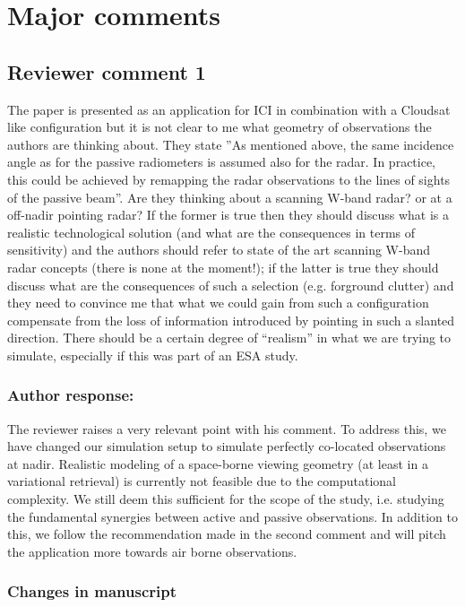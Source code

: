 \section{Major comments}

\subsection*{Reviewer comment 1}

The paper is presented as an application for ICI in combination with a
Cloudsat like configuration but it is not clear to me what geometry of
observations the authors are thinking about. They state ''As mentioned above, the
same incidence angle as for the passive radiometers is assumed also for the
radar. In practice, this could be achieved by remapping the radar observations to
the lines of sights of the passive beam''. Are they thinking about a scanning
W-band radar? or at a off-nadir pointing radar? If the former is true then they
should discuss what is a realistic technological solution (and what are the
consequences in terms of sensitivity) and the authors should refer to state of
the art scanning W-band radar concepts (there is none at the moment!); if the
latter is true they should discuss what are the consequences of such a selection
(e.g. forground clutter) and they need to convince me that what we could gain
from such a configuration compensate from the loss of information introduced by
pointing in such a slanted direction. There should be a certain degree of
“realism” in what we are trying to simulate, especially if this was part of an
ESA study.

\subsubsection*{Author response:}

The reviewer raises a very relevant point with his comment. To address this, we
have changed our simulation setup to simulate perfectly co-located observations
at nadir. Realistic modeling of a space-borne viewing geometry (at least in a
variational retrieval) is currently not feasible due to the computational
complexity. We still deem this sufficient for the scope of the study, i.e.
studying the fundamental synergies between active and passive observations. In
addition to this, we follow the recommendation made in the second comment and
will pitch the application more towards air borne observations.

\subsubsection*{Changes in manuscript}

